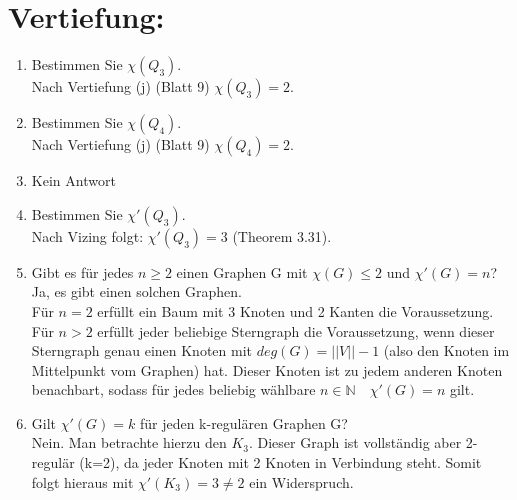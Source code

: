 

\usepackage{ tipa }
\usepackage{tikz}
\usepackage{amssymb}
\usepackage{listings}


    \maketitle
    \section*{Vertiefung:}
    \begin{enumerate}[label=(\alph*)]
        \item Bestimmen Sie $\chi(Q_3)$.\\
        Nach Vertiefung (j) (Blatt 9) $\chi (Q_3) = 2$. 
                
        \item Bestimmen Sie $\chi(Q_4)$.\\
        Nach Vertiefung (j) (Blatt 9) $\chi (Q_4) = 2$.        
                
        \item Kein Antwort
               
        \item Bestimmen Sie $\chi'(Q_3)$.\\
        Nach Vizing folgt: $\chi'(Q_3) = 3$ (Theorem 3.31).
        
        \item Gibt es für jedes $n \geq 2$ einen Graphen G mit $\chi(G) \leq 2$ und $\chi' (G) = n$?\\
        Ja, es gibt einen solchen Graphen.\\
        Für $n=2$ erfüllt ein Baum mit 3 Knoten und 2 Kanten die Voraussetzung.
        Für $n > 2$ erfüllt jeder beliebige Sterngraph die Voraussetzung, wenn dieser Sterngraph genau einen Knoten mit 
        $deg(G)= ||V|| - 1$ (also den Knoten im Mittelpunkt vom Graphen) hat. Dieser Knoten ist zu jedem anderen Knoten 
        benachbart, sodass für jedes beliebig wählbare $ n \in \mathbb{N} \quad \chi'(G) = n$ gilt.  
        
        \item Gilt $\chi ' (G) = k $ für jeden k-regulären Graphen G? \\
        Nein. Man betrachte hierzu den $K_3$. Dieser Graph ist vollständig aber 2-regulär (k=2), da jeder Knoten mit 2 
        Knoten in Verbindung steht. Somit folgt hieraus mit $\chi'(K_3) = 3 \neq 2$ ein Widerspruch.
        

\end{enumerate}
